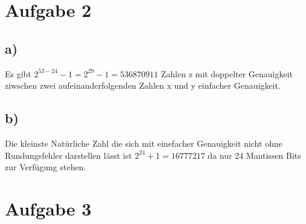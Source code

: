 \documentclass[10pt,a4paper]{article}
\begin{document}
\section*{Aufgabe 2}
\subsection*{a)}
Es gibt $2^{53-24}-1=2^{29}-1=536870911$ Zahlen z mit doppelter Genauigkeit ziwschen zwei aufeinanderfolgenden Zahlen x und y einfacher Genauigkeit.
\subsection*{b)}
Die kleinste Natürliche Zahl die sich mit einefacher Genauigkeit nicht ohne Rundungsfehler darstellen lässt ist $2^{24}+1 = 16777217$ da nur 24 Mantissen Bits zur Verfügung stehen.

\section*{Aufgabe 3}
\end{document}
